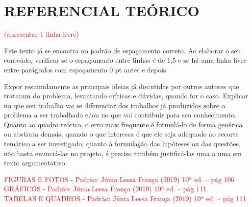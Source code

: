\section{REFERENCIAL TEÓRICO}  

\textcolor{red}{(apresentar 1 linha livre)}

Este texto já se encontra no padrão de espaçamento correto. Ao elaborar o seu conteúdo, verificar se o espaçamento entre linhas é de 1,5 e se há uma linha livre entre parágrafos com espaçamento 0 pt antes e depois. 

Expor resumidamente as principais ideias já discutidas por outros autores que trataram do problema, levantando críticas e dúvidas, quando for o caso. Explicar no que seu trabalho vai se diferenciar dos trabalhos já produzidos sobre o problema a ser trabalhado e/ou no que vai contribuir para seu conhecimento. Quanto ao quadro teórico, o erro mais frequente é formulá-lo de forma genérica ou abstrata demais, quando o que interessa é que ele seja adequado ao recorte temático a ser investigado; quanto à formulação das hipóteses ou das questões, não basta enunciá-las no projeto, é preciso também justificá-las uma a uma em texto argumentativo. 

\noindent
\textcolor{red}{FIGURAS E FOTOS - Padrão: Júnia Lessa França (2019) 10ª ed. – pág 106 
\\
GRÁFICOS - Padrão: Júnia Lessa França (2019) 10ª ed. – pág 111 
\\
TABELAS E QUADROS - Padrão: Júnia Lessa França (2019) 10ª ed. – pág 111 }
